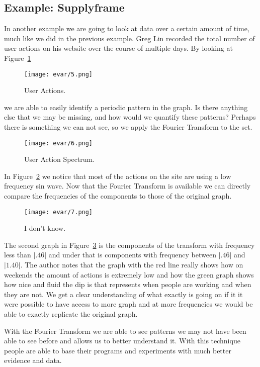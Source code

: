 \documentclass [../article.tex]{subfiles}
\begin{document}
  \subsection{Example: Supplyframe}
  In another example we are going to look at data over a certain
  amount of time, much like we did in the previous example. 
  Greg Lin recorded the total number of
  user actions on his website over the course of multiple days. 
  By looking at Figure~\ref{fig:useractions}
  \begin{figure}[htbp]
    \texttt{[image: evar/5.png]}
    \caption{User Actions.}
    \label{fig:useractions}
  \end{figure}
  we are able to easily identify a periodic pattern in
  the graph. Is there anything else that we may be missing, and
  how would we quantify these patterns?
  Perhaps there is something we can not see, so we apply the
  Fourier Transform to the set.
  \begin{figure}[htbp]
    \texttt{[image: evar/6.png]}
    \caption{User Action Spectrum.}
    \label{fig:actionspectrum}
  \end{figure}
  In Figure~\ref{fig:actionspectrum} we notice that most of the actions 
  on the site are using a low frequency sin wave. Now that the Fourier 
  Transform is available we can directly compare the frequencies of the 
  components to those of the original graph.
  \begin{figure}[htbp]
    \texttt{[image: evar/7.png]}
    \caption{I don't know.}
    \label{fig:idk}
  \end{figure}
  The second graph in Figure~\ref{fig:idk} is the components of the
  transform with frequency less than $|.46|$ and under that is
  components with frequency between $|.46|$ and $|1.40|$.  The author
  notes that  the graph with the red line really shows how on
  weekends the amount of actions is extremely low and how the
  green graph shows how nice and fluid the dip is that represents
  when people are working and when they are not. We get a clear
  understanding of what exactly is going on if it it were possible
  to have access to more graph and at more frequencies we would be
  able to exactly replicate the original graph.

  With the Fourier Transform we are able to see patterns we may not 
  have been able to see before and allows us to better
  understand it. With this technique people are able to
  base their programs and experiments with much better evidence
  and data.
\end{document}
